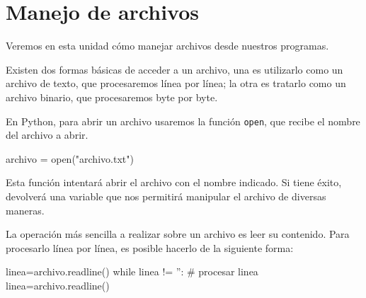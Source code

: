 
%



\chapter{Manejo de archivos}
\label{uni:archivos}

Veremos en esta unidad cómo manejar archivos desde nuestros
programas.

Existen dos formas básicas de acceder a un archivo, una es
utilizarlo como un archivo de texto, que procesaremos línea por
línea; la otra es tratarlo como un archivo binario, que
procesaremos byte por byte.

En Python, para abrir un archivo usaremos la función \lstinline!open!, que
recibe el nombre del archivo a abrir.

\begin{codigo-python-sn}
archivo = open("archivo.txt")
\end{codigo-python-sn}

Esta función intentará abrir el archivo con el nombre indicado.  Si tiene
éxito, devolverá una variable que nos permitirá manipular el archivo de
diversas maneras.

La operación más sencilla a realizar sobre un archivo es leer su contenido.
Para procesarlo línea por línea, es posible hacerlo de la siguiente forma:

\begin{codigo-python-sn}
linea=archivo.readline()
while linea != '':
    # procesar linea
    linea=archivo.readline()
\end{codigo-python-sn}

